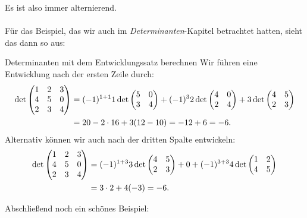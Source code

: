 Es ist also immer alternierend.\\
\\
Für das Beispiel, das wir auch im \textit{Determinanten}-Kapitel betrachtet hatten, sieht das dann so aus:
\begin{Beispiel}{Determinanten mit dem Entwicklungssatz berechnen}
Wir führen eine Entwicklung nach der ersten Zeile durch:
\begin{align*}
\det\begin{pmatrix}1&2&3\\4&5&0\\2&3&4\end{pmatrix}&=(-1)^{1+1}1\det\begin{pmatrix}5&0\\3&4\end{pmatrix}+(-1)^32\det\begin{pmatrix}4&0\\2&4\end{pmatrix}+3\det\begin{pmatrix}4&5\\2&3\end{pmatrix}\\
&=20-2\cdot16+3(12-10)=-12+6=-6.
\end{align*}
Alternativ können wir auch nach der dritten Spalte entwickeln:
\begin{align*}
\det\begin{pmatrix}1&2&3\\4&5&0\\2&3&4\end{pmatrix}&=(-1)^{1+3}3\det\begin{pmatrix}4&5\\2&3\end{pmatrix}+0+(-1)^{3+3}4\det\begin{pmatrix}1&2\\4&5\end{pmatrix}\\
&=3\cdot2+4(-3)=-6.
\end{align*}
\end{Beispiel}
Abschließend noch ein schönes Beispiel:
